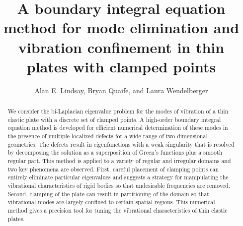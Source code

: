 \documentclass[times]{article}
\begin{document}
\title{A boundary integral equation method for mode elimination and
vibration confinement in thin plates with clamped points}
\author{Alan E. Lindsay, Bryan Quaife, and Laura Wendelberger}

\maketitle

\begin{abstract}
We consider the bi-Laplacian eigenvalue problem for the modes of
vibration of a thin elastic plate with a discrete set of clamped points.
A high-order boundary integral equation method is developed for
efficient numerical determination of these modes in the presence of
multiple localized defects for a wide range of two-dimensional
geometries. The defects result in eigenfunctions with a weak singularity
that is resolved by decomposing the solution as a superposition of
Green's functions plus a smooth regular part. This method is applied to
a variety of regular and irregular domains and two key phenomena are
observed. First, careful placement of clamping points can entirely
eliminate particular eigenvalues and suggests a strategy for
manipulating the vibrational characteristics of rigid bodies so that
undesirable frequencies are removed.  Second, clamping of the plate can
result in partitioning of the domain so that vibrational modes are
largely confined to certain spatial regions. This numerical method gives
a precision tool for tuning the vibrational characteristics of thin
elastic plates. 
\end{abstract}


\end{document}
